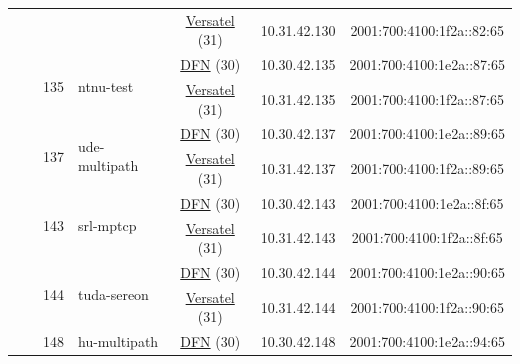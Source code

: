 \begin{small}
\begin{center}
\begin{longtable}{|c|c|c|c|c|c|c|c|}
  &  &  &  & \multicolumn{2}{|c|}{\tiny{\href{http://www.versatel.de}{Versatel} (31)}} & \tiny{10.31.42.130} & \tiny{2001:700:4100:1f2a::82:65} \\* \cline{3-3}\cline{4-4}\cline{5-5}\cline{6-6}\cline{7-7}\cline{8-8}
  &  & \multirow{2}{*}{\tiny{135}} & \multicolumn{1}{|l|}{\multirow{2}{*}{\tiny{ntnu-test}}} & \multicolumn{2}{|c|}{\tiny{\href{https://www.dfn.de}{DFN} (30)}} & \tiny{10.30.42.135} & \tiny{2001:700:4100:1e2a::87:65} \\* \cline{5-5}\cline{6-6}\cline{7-7}\cline{8-8}
  &  &  &  & \multicolumn{2}{|c|}{\tiny{\href{http://www.versatel.de}{Versatel} (31)}} & \tiny{10.31.42.135} & \tiny{2001:700:4100:1f2a::87:65} \\* \cline{3-3}\cline{4-4}\cline{5-5}\cline{6-6}\cline{7-7}\cline{8-8}
  &  & \multirow{2}{*}{\tiny{137}} & \multicolumn{1}{|l|}{\multirow{2}{*}{\tiny{ude-multipath}}} & \multicolumn{2}{|c|}{\tiny{\href{https://www.dfn.de}{DFN} (30)}} & \tiny{10.30.42.137} & \tiny{2001:700:4100:1e2a::89:65} \\* \cline{5-5}\cline{6-6}\cline{7-7}\cline{8-8}
  &  &  &  & \multicolumn{2}{|c|}{\tiny{\href{http://www.versatel.de}{Versatel} (31)}} & \tiny{10.31.42.137} & \tiny{2001:700:4100:1f2a::89:65} \\* \cline{3-3}\cline{4-4}\cline{5-5}\cline{6-6}\cline{7-7}\cline{8-8}
  &  & \multirow{2}{*}{\tiny{143}} & \multicolumn{1}{|l|}{\multirow{2}{*}{\tiny{srl-mptcp}}} & \multicolumn{2}{|c|}{\tiny{\href{https://www.dfn.de}{DFN} (30)}} & \tiny{10.30.42.143} & \tiny{2001:700:4100:1e2a::8f:65} \\* \cline{5-5}\cline{6-6}\cline{7-7}\cline{8-8}
  &  &  &  & \multicolumn{2}{|c|}{\tiny{\href{http://www.versatel.de}{Versatel} (31)}} & \tiny{10.31.42.143} & \tiny{2001:700:4100:1f2a::8f:65} \\* \cline{3-3}\cline{4-4}\cline{5-5}\cline{6-6}\cline{7-7}\cline{8-8}
  &  & \multirow{2}{*}{\tiny{144}} & \multicolumn{1}{|l|}{\multirow{2}{*}{\tiny{tuda-sereon}}} & \multicolumn{2}{|c|}{\tiny{\href{https://www.dfn.de}{DFN} (30)}} & \tiny{10.30.42.144} & \tiny{2001:700:4100:1e2a::90:65} \\* \cline{5-5}\cline{6-6}\cline{7-7}\cline{8-8}
  &  &  &  & \multicolumn{2}{|c|}{\tiny{\href{http://www.versatel.de}{Versatel} (31)}} & \tiny{10.31.42.144} & \tiny{2001:700:4100:1f2a::90:65} \\* \cline{3-3}\cline{4-4}\cline{5-5}\cline{6-6}\cline{7-7}\cline{8-8}
  &  & \multirow{2}{*}{\tiny{148}} & \multicolumn{1}{|l|}{\multirow{2}{*}{\tiny{hu-multipath}}} & \multicolumn{2}{|c|}{\tiny{\href{https://www.dfn.de}{DFN} (30)}} & \tiny{10.30.42.148} & \tiny{2001:700:4100:1e2a::94:65} \\* \cline{5-5}\cline{6-6}\cline{7-7}\cline{8-8}

\end{longtable}
\end{center}
\end{small}
